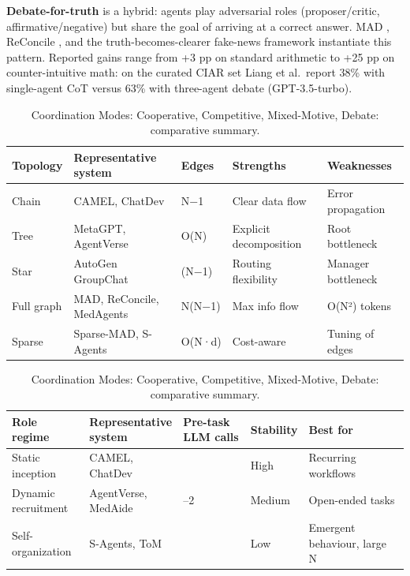 \documentclass{article}
\begin{document}
\textbf{Debate-for-truth} is a hybrid: agents play adversarial roles (proposer/critic, affirmative/negative) but share the goal of arriving at a correct answer. MAD \citep{liang2024encouragingdiverge}, ReConcile \citep{chen2024asurveyonllmbasedm}, and the truth-becomes-clearer fake-news framework \citep{liu20252025} instantiate this pattern. Reported gains range from +3 pp on standard arithmetic to +25 pp on counter-intuitive math: on the curated CIAR set Liang et al.~report 38\% with single-agent CoT versus 63\% with three-agent debate (GPT-3.5-turbo).

\begin{table}[t]
\centering
\caption{Coordination Modes: Cooperative, Competitive, Mixed-Motive, Debate: comparative summary.}
\label{tab:coordination-modes-cooperative-competitive-mixed-motive-deba}
\begin{tabular}{>{\raggedright\arraybackslash}p{0.1235\linewidth}
  >{\raggedright\arraybackslash}p{0.3086\linewidth}
  >{\raggedright\arraybackslash}p{0.0741\linewidth}
  >{\raggedright\arraybackslash}p{0.2716\linewidth}
  >{\raggedright\arraybackslash}p{0.2222\linewidth}}
\toprule
Topology & Representative system & Edges & Strengths & Weaknesses \\
\midrule
Chain & CAMEL, ChatDev & N−1 & Clear data flow & Error propagation \\
Tree & MetaGPT, AgentVerse & O(N) & Explicit decomposition & Root bottleneck \\
Star & AutoGen GroupChat & 2(N−1) & Routing flexibility & Manager bottleneck \\
Full graph & MAD, ReConcile, MedAgents & N(N−1) & Max info flow & O(N²) tokens \\
Sparse & Sparse-MAD, S-Agents & O(N·d) & Cost-aware & Tuning of edges \\
\end{tabular}
\end{table}

\begin{table}[t]
\centering
\caption{Coordination Modes: Cooperative, Competitive, Mixed-Motive, Debate: comparative summary.}
\label{tab:coordination-modes-cooperative-competitive-mixed-motive-deba-2}
\begin{tabular}{>{\raggedright\arraybackslash}p{0.2021\linewidth}
  >{\raggedright\arraybackslash}p{0.2234\linewidth}
  >{\raggedright\arraybackslash}p{0.1915\linewidth}
  >{\raggedright\arraybackslash}p{0.0957\linewidth}
  >{\raggedright\arraybackslash}p{0.2872\linewidth}}
\toprule
Role regime & Representative system & Pre-task LLM calls & Stability & Best for \\
\midrule
Static inception & CAMEL, ChatDev & 0 & High & Recurring workflows \\
Dynamic recruitment & AgentVerse, MedAide & 1--2 & Medium & Open-ended tasks \\
Self-organization & S-Agents, ToM & 0 & Low & Emergent behaviour, large N \\
\end{tabular}
\end{table}
\end{document}
